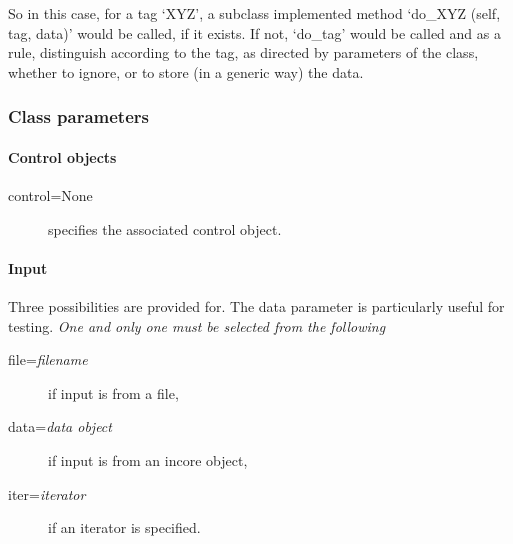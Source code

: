 So in this case, for a tag `XYZ', a subclass implemented method
`do\_XYZ (self, tag, data)' would be called, if it exists. If not,
`do\_tag' would be called and as a rule, distinguish according to the
tag, as directed by parameters of the class, whether to ignore, or to
store (in a generic way) the data. 


\subsubsection{Class parameters}


\paragraph{Control objects}

\begin{description}
\item[control=None] specifies the associated control object.
\end{description}


\paragraph{Input} Three possibilities are provided for. The data
parameter is particularly useful for testing. \textit{One and only one
must be selected from the following}

\begin{description}
\item[file=\textit{filename}] if input is from a file,
\item[data=\textit{data object}] if input is from an incore object,
\item[iter=\textit{iterator}] if an iterator is specified.
\end{description}





  


  
